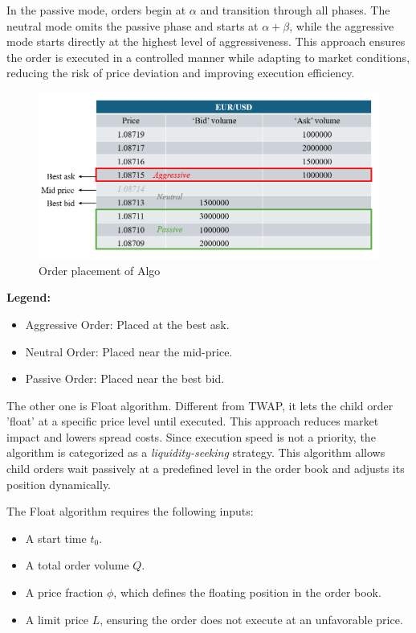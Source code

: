 In the passive mode, orders begin at $\alpha$ and transition through all phases. The neutral mode omits the passive phase and starts at $\alpha + \beta$, while the aggressive mode starts directly at the highest level of aggressiveness. This approach ensures the order is executed in a controlled manner while adapting to market conditions, reducing the risk of price deviation and improving execution efficiency.

\begin{figure}[h]
    \centering
    \includegraphics[width=\linewidth]{figures/order placement.png}
    \caption{Order placement of Algo}
    \label{fig:order placement}
\end{figure}

\noindent \textbf{Legend:}
\begin{itemize}
    \item Aggressive Order: Placed at the best ask.
    \item Neutral Order: Placed near the mid-price.
    \item Passive Order: Placed near the best bid.
\end{itemize}

The other one is Float algorithm. Different from TWAP, it lets the child order 'float' at a specific price level until executed. This approach reduces market impact and lowers spread costs. Since execution speed is not a priority, the algorithm is categorized as a \textit{liquidity-seeking} strategy. This algorithm allows child orders wait passively at a predefined level in the order book and adjusts its position dynamically.

The Float algorithm requires the following inputs:
\begin{itemize}
    \item A start time $t_0$.
    \item A total order volume $Q$.
    \item A price fraction $\phi$, which defines the floating position in the order book.
    \item A limit price $L$, ensuring the order does not execute at an unfavorable price.
\end{itemize}

